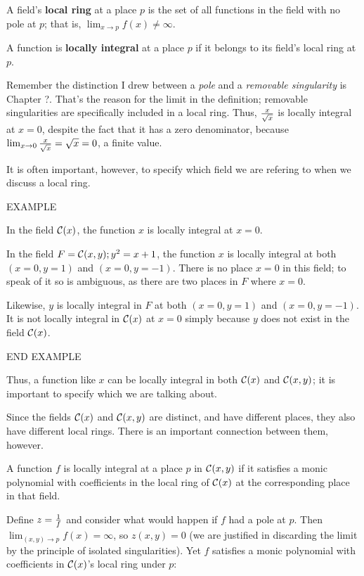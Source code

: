 

A field's {\bf local ring} at a place $p$ is the set of
all functions in the field with no pole at $p$; that
is, $ \lim_{x\to p} f(x) \ne \infty $.

A function is {\bf locally integral} at a place $p$
if it belongs to its field's local ring at $p$.

\enddefinition

Remember the distinction I drew between a {\it pole} and a {\it
removable singularity} is Chapter ?.  That's the reason for the limit
in the definition; removable singularities are specifically included
in a local ring.  Thus, $x\over\sqrt{x}$ is locally integral at $x=0$,
despite the fact that it has a zero denominator, because
$\lim_{x\to0}{x\over\sqrt{x}}=\sqrt{x}=0$, a finite value.

It is often important, however, to specify which field we are
refering to when we discuss a local ring.

EXAMPLE

In the field ${\cal C}(x)$, the function $x$ is locally integral at $x=0$.

In the field $F = {{\cal C}(x,y); y^2=x+1}$, the function $x$ is locally integral
at both $(x=0, y=1)$ and $(x=0, y=-1)$.  There is no place $x=0$ in
this field; to speak of it so is ambiguous, as there are two places
in $F$ where $x=0$.

Likewise, $y$ is locally integral in $F$ at both $(x=0, y=1)$ and
$(x=0, y=-1)$.  It is not locally integral in ${\cal C}(x)$ at $x=0$ simply
because $y$ does not exist in the field ${\cal C}(x)$.

END EXAMPLE

Thus, a function like $x$ can be locally integral in both ${\cal C}(x)$ and
${\cal C}(x,y)$; it is important to specify which we are talking about.

Since the fields ${\cal C}(x)$ and ${\cal C}(x,y)$ are distinct, and have different
places, they also have different local rings.  There is an important
connection between them, however.

\theorem

A function $f$ is locally integral at a place $p$ in ${\cal C}(x,y)$ if it
satisfies a monic polynomial with coefficients in the local ring of
${\cal C}(x)$ at the corresponding place in that field.

\proof

Define $z = {1 \over f}$ and consider what would happen if $f$ had a
pole at $p$.  Then $\lim_{(x,y)\to p} f(x) = \infty$, so $z(x,y) = 0$
(we are justified in discarding the limit by the principle of isolated
singularities).  Yet $f$ satisfies a monic polynomial with coefficients
in ${\cal C}(x)$'s local ring under $p$:


